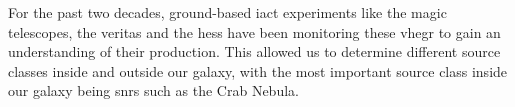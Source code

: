 For the past two decades, ground-based \gls{iact} experiments like the \gls{magic} telescopes, the
\gls{veritas} and the \gls{hess} have been monitoring these \gls{vhegr} to gain an understanding of
their production. This allowed us to determine different source classes inside and outside our galaxy,
with the most important source class inside our galaxy being \glspl{snr} such as the Crab Nebula.





